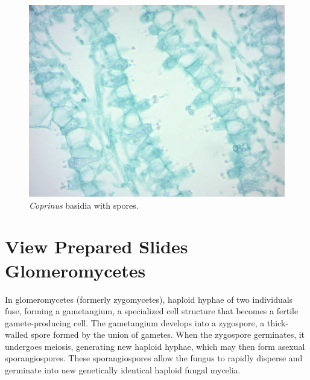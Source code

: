 \begin{figure}

{\centering \includegraphics[width=0.7\linewidth]{./figures/fungi/basidia}

}

\caption{\emph{Coprinus} basidia with spores.}\label{fig:basidia}
\end{figure}

\section{View Prepared Slides
Glomeromycetes}\label{view-the-prepared-slides-glomeromycetes}

In glomeromycetes (formerly zygomycetes), haploid hyphae of two
individuals fuse, forming a gametangium, a specialized cell structure
that becomes a fertile gamete-producing cell. The gametangium develops
into a zygospore, a thick-walled spore formed by the union of gametes.
When the zygospore germinates, it undergoes meiosis, generating new
haploid hyphae, which may then form asexual sporangiospores. These
sporangiospores allow the fungus to rapidly disperse and germinate into
new genetically identical haploid fungal mycelia.

